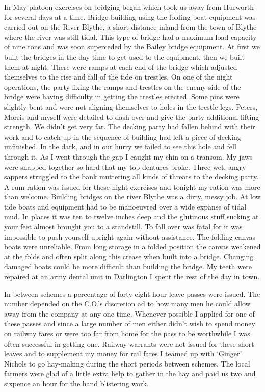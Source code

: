 In May platoon exercises on bridging began which took us away from
Hurworth for several days at a time. Bridge building using the folding
boat equipment was carried out on the River Blythe, a short distance
inland from the town of Blythe where the river was still tidal. This
type of bridge had a maximum load capacity of nine tons and was soon
superceded by the Bailey bridge equipment. At first we built the
bridges in the day time to get used to the equipment, then we built
them at night. There were ramps at each end of the bridge which
adjusted themselves to the rise and fall of the tide on trestles. On
one of the night operations, the party fixing the ramps and trestles
on the enemy side of the bridge were having difficulty in getting the
trestles erected. Some pins were slightly bent and were not aligning
themselves to holes in the trestle legs. \Sappers Peters, Morris and
myself were detailed to dash over and give the party additional
lifting strength. We didn't get very far. The decking party had
fallen behind with their work and to catch up in the sequence of
building had left a piece of decking unfinished. In the dark, and in
our hurry we failed to see this hole and fell through it. As I went
through the gap I caught my chin on a transom. My jaws were snapped
together so hard that my top dentures broke. Three wet, angry sappers
struggled to the bank muttering all kinds of threats to the decking
party. A rum ration was issued for these night exercises and tonight
my ration was more than welcome. Building bridges on the river Blythe
was a dirty, messy job. At low tide boats and equipment had to be
manoeuvred over a wide expanse of tidal mud. In places it was ten to
twelve inches deep and the glutinous stuff sucking at your feet almost
brought you to a standstill. To fall over was fatal for it was
impossible to push yourself upright again without assistance. The
folding canvas boats were unreliable. From long storage in a folded
position the canvas weakened at the folds and often split along this
crease when built into a bridge. Changing damaged boats could be more
difficult than building the bridge. My teeth were repaired at an army
dental unit in Darlington I spent the rest of the day in town.

In between schemes a percentage of forty-eight hour leave passes were
issued. The number depended on the C.O.'s discretion ad to how many
men he could allow away from the company at any one time. Whenever
possible I applied for one of these passes and since a large number of
men either didn't wish to spend money on railway fares or were too
far from home for the pass to be worthwhile I was often successful in
getting one. Railway warrants were not issued for these short leaves
and to supplement my money for rail fares I teamed up with \sapper
`Ginger' Nichols to go hay-making during the short periods between
schemes. The local farmers were glad of a little extra help to gather
in the hay and paid us two and sixpence an hour for the hand blistering
work.

